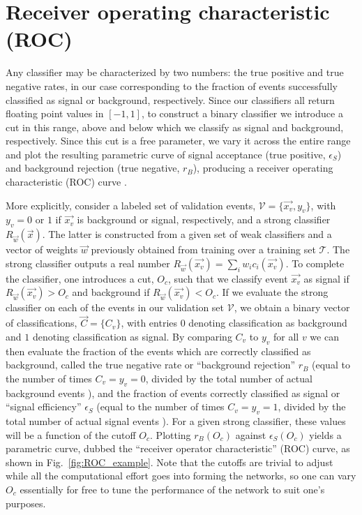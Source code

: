 \documentclass[fleqn,10pt]{wlscirep}
\newcommand{\mc}{\mathcal}
\begin{document}
\section*{Receiver operating characteristic (ROC)}
Any classifier may be characterized by two numbers: the true positive and true negative rates, in our case corresponding to the fraction of events successfully classified as signal or background, respectively. Since our classifiers all return floating point values in $[-1,1]$, to construct a binary classifier we introduce a cut in this range, above and below which we classify as signal and background, respectively. Since this cut is a free parameter, we vary it across the entire range and plot the resulting parametric curve of signal acceptance (true positive, $\epsilon_S$) and background rejection (true negative, $r_B$), producing a receiver operating characteristic (ROC) curve \cite{Hanley:1982}. 

More explicitly, consider a labeled set of validation events, $\mc{V}=\{\vec{x_v},y_v\}$, with $y_v=0$ or $1$ if $\vec{x_v}$ is background or signal, respectively, and a strong classifier $R_{\vec{w}}(\vec{x})$. The latter is constructed from a given set of weak classifiers and a vector of weights $\vec{w}$ previously obtained from training over a training set $\mc{T}$. The strong classifier outputs a real number $R_{\vec{w}}(\vec{x_v})=\sum_i w_i c_i(\vec{x_v})$. To complete the classifier, one introduces a cut, $O_c$, such that we classify event $\vec{x_v}$ as signal if $R_{\vec{w}}(\vec{x_v})>O_c$ and background if $R_{\vec{w}}(\vec{x_v})<O_c$. If we evaluate the strong classifier on each of the events in our validation set $\mc{V}$, we obtain a binary vector of classifications, $\vec{C}=\{C_v\}$, with entries $0$ denoting classification as background and $1$ denoting classification as signal. By comparing $C_v$ to $y_v$ for all $v$ we can then evaluate the fraction of the events which are correctly classified as background, called the true negative rate or ``background rejection'' $r_B$ (equal to the number of times $C_v=y_v=0$, divided by the total number of actual background events
%
), 
and the fraction of events correctly classified as signal or ``signal efficiency'' $\epsilon_S$ (equal to the number of times $C_v=y_v=1$, divided by the total number of actual signal events%
). 
For a given strong classifier, these values will be a function of the cutoff $O_c$. Plotting $r_B(O_c)$ against $\epsilon_S(O_c)$ yields a parametric curve, dubbed the ``receiver operator characteristic'' (ROC) curve, as shown in Fig.~\ref{fig:ROC_example}. Note that the cutoffs are trivial to adjust while all the computational effort goes into forming the networks, so one can vary $O_c$ essentially for free to tune the performance of the network to suit one's purposes. 
\end{document}
